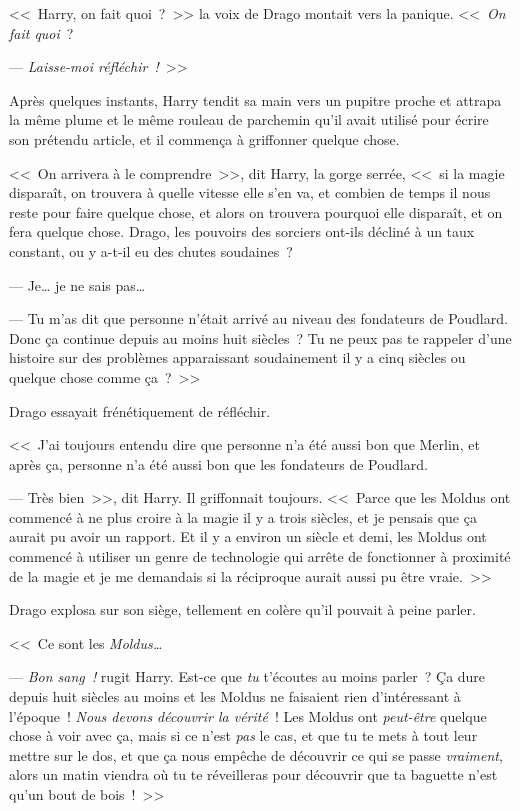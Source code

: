 <<~Harry, on fait quoi~?~>> la voix de Drago montait vers la panique. <<~\emph{On fait quoi}~?

--- \emph{Laisse-moi réfléchir~!}~>>

Après quelques instants, Harry tendit sa main vers un pupitre proche et attrapa la même plume et le même rouleau de parchemin qu'il avait utilisé pour écrire son prétendu article, et il commença à griffonner quelque chose.

<<~On arrivera à le comprendre~>>, dit Harry, la gorge serrée, <<~si la magie disparaît, on trouvera à quelle vitesse elle s'en va, et combien de temps il nous reste pour faire quelque chose, et alors on trouvera pourquoi elle disparaît, et on fera quelque chose. Drago, les pouvoirs des sorciers ont-ils décliné à un taux constant, ou y a-t-il eu des chutes soudaines~?

--- Je… je ne sais pas…

--- Tu m'as dit que personne n'était arrivé au niveau des fondateurs de Poudlard. Donc ça continue depuis au moins huit siècles~? Tu ne peux pas te rappeler d'une histoire sur des problèmes apparaissant soudainement il y a cinq siècles ou quelque chose comme ça~?~>>

Drago essayait frénétiquement de réfléchir.

<<~J'ai toujours entendu dire que personne n'a été aussi bon que Merlin, et après ça, personne n'a été aussi bon que les fondateurs de Poudlard.

--- Très bien~>>, dit Harry. Il griffonnait toujours. <<~Parce que les Moldus ont commencé à ne plus croire à la magie il y a trois siècles, et je pensais que ça aurait pu avoir un rapport. Et il y a environ un siècle et demi, les Moldus ont commencé à utiliser un genre de technologie qui arrête de fonctionner à proximité de la magie et je me demandais si la réciproque aurait aussi pu être vraie.~>>

Drago explosa sur son siège, tellement en colère qu'il pouvait à peine parler.

<<~Ce sont les \emph{Moldus…}

--- \emph{Bon sang~!} rugit Harry. Est-ce que \emph{tu} t'écoutes au moins parler~? Ça dure depuis huit siècles au moins et les Moldus ne faisaient rien d'intéressant à l'époque~! \emph{Nous devons découvrir la vérité}~! Les Moldus ont \emph{peut-être} quelque chose à voir avec ça, mais si ce n'est \emph{pas} le cas, et que tu te mets à tout leur mettre sur le dos, et que ça nous empêche de découvrir ce qui se passe \emph{vraiment}, alors un matin viendra où tu te réveilleras pour découvrir que ta baguette n'est qu'un bout de bois~!~>>

